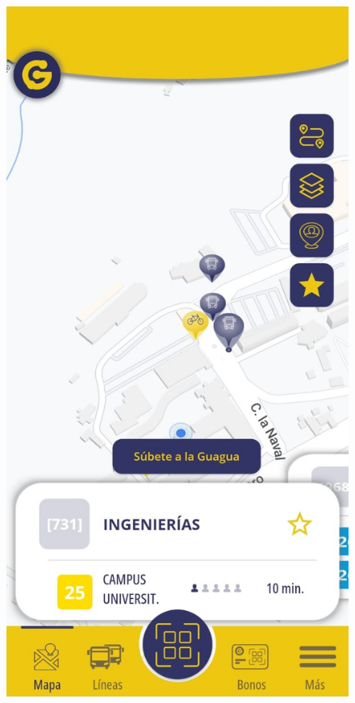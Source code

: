 \documentclass[a4paper,12pt]{article}
\begin{document}
\begin{figure}[htbp]
    \centering
    \begin{minipage}{0.5\textwidth}
        \includegraphics[width=\linewidth]{Images/seccion_principal.jpg}
    \end{minipage}%
    \hspace{0.8cm}
    \begin{minipage}{0.3\textwidth}
        \setlength{\parskip}{20pt}  %
        

\end{minipage}
\end{figure}
\end{document}
